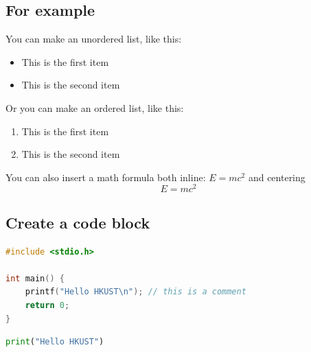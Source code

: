 \documentclass[12pt]{article}
\begin{document}
\subsection{For example}
You can make an unordered list, like this:
\begin{itemize}
    \item This is the first item
    \item This is the second item
\end{itemize}

Or you can make an ordered list, like this:
\begin{enumerate}
    \item This is the first item
    \item This is the second item
\end{enumerate}

You can also insert a math formula both inline: $E = mc^2$ and centering $$E = mc^2$$

\subsection{Create a code block}
\begin{lstlisting}[language=C, caption={Example C code}]
#include <stdio.h>

int main() {
    printf("Hello HKUST\n"); // this is a comment
    return 0;
}
\end{lstlisting}

\begin{lstlisting}[language=Python, caption={Example Python code}]
print("Hello HKUST")
\end{lstlisting}
\end{document}
